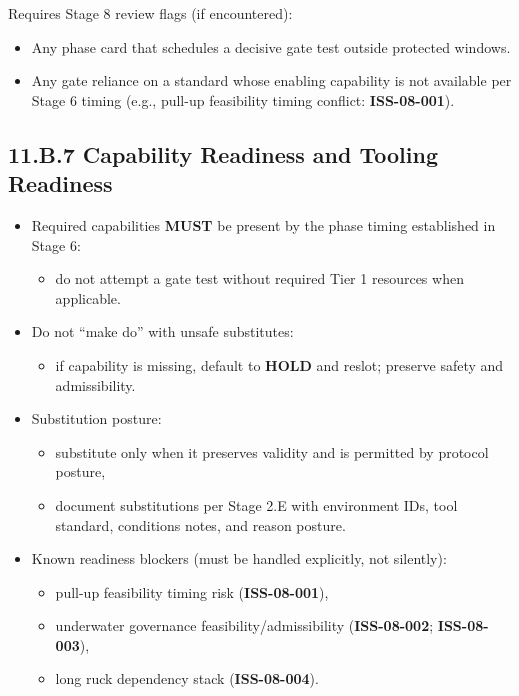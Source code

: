 \documentclass[10pt]{article}
\begin{document}
Requires Stage 8 review flags (if encountered):

\begin{itemize}
\item Any phase card that schedules a decisive gate test outside protected windows.
\item Any gate reliance on a standard whose enabling capability is not available per Stage 6 timing (e.g., pull-up feasibility timing conflict: \textbf{ISS-08-001}).
\end{itemize}

\newpage
\subsection*{11.B.7 Capability Readiness and Tooling Readiness}
{}

\begin{itemize}
\item Required capabilities \textbf{MUST} be present by the phase timing established in Stage 6:
\begin{itemize}
\item do not attempt a gate test without required Tier 1 resources when applicable.
\end{itemize}
\item Do not “make do” with unsafe substitutes:
\begin{itemize}
\item if capability is missing, default to \textbf{HOLD} and reslot; preserve safety and admissibility.
\end{itemize}
\item Substitution posture:
\begin{itemize}
\item substitute only when it preserves validity and is permitted by protocol posture,
\item document substitutions per Stage 2.E with environment IDs, tool standard, conditions notes, and reason posture.
\end{itemize}
\item Known readiness blockers (must be handled explicitly, not silently):
\begin{itemize}
\item pull-up feasibility timing risk (\textbf{ISS-08-001}),
\item underwater governance feasibility/admissibility (\textbf{ISS-08-002}; \textbf{ISS-08-003}),
\item long ruck dependency stack (\textbf{ISS-08-004}).
\end{itemize}
\end{itemize}
\end{document}
